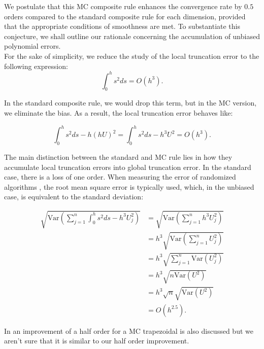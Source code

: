 \documentclass[a4paper,12pt]{article}
\begin{document}
We postulate that this MC composite rule enhances the convergence
rate by $0.5$ orders compared to the standard composite rule for each dimension,
provided that the appropriate conditions of smoothness are met.
To substantiate this conjecture, we shall outline our rationale concerning
the accumulation of unbiased polynomial errors.\\

For the sake of simplicity, we reduce the study of the local truncation error
to the following expression:
\begin{equation}
    \int_{0}^{h} s^{2}ds = O(h^{3}).
\end{equation}

In the standard composite rule, we would drop this term, but in
the MC version, we eliminate the bias. As a result,
the local truncation error behaves like:

\begin{equation}
    \int_{0}^{h} s^{2}ds- h(hU)^{2} = \int_{0}^{h} s^{2}ds- h^{3}U^{2} = O(h^{3}).
\end{equation}

The main distinction between the standard and MC rule lies in how they
accumulate local truncation errors into global truncation error. In the standard
case, there is a loss of one order. When measuring the error of randomized algorithms
, the root mean square error is typically used, which, in the unbiased case,
is equivalent to the standard deviation:

\begin{align}
    \sqrt{\text{Var}\left(\sum_{j=1}^{n} \int_{0}^{h} s^{2}ds- h^{3}U_{j}^{2}\right)}
     & =\sqrt{\text{Var}\left(\sum_{j=1}^{n} h^{3}U_{j}^{2}\right)}   \\
     & =h^{3} \sqrt{\text{Var}\left( \sum_{j=1}^{n} U_{j}^{2}\right)} \\
     & =h^{3} \sqrt{ \sum_{j=1}^{n}\text{Var} (U_{j}^{2})}            \\
     & =h^{3} \sqrt{ n \text{Var}(U^{2})}                             \\
     & =h^{3} \sqrt{n} \sqrt{ \text{Var}(U^{2})}                      \\
     & = O(h^{2.5}).
\end{align}


\begin{related}
    In \cite{wu_randomised_2020} an improvement of a half order
    for a MC trapezoidal is also discussed but we aren't sure that it is similar to our
    half order improvement.
\end{related}
\end{document}
